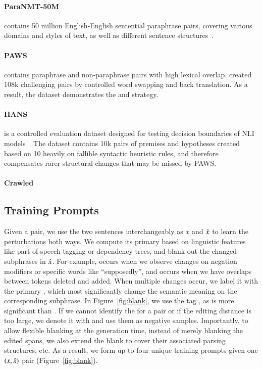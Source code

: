 \paragraph{ParaNMT-50M} contains 50 million English-English sentential paraphrase pairs, covering various domains and styles of text, as well as different sentence structures~\citet{wieting2017paranmt}. 

\paragraph{PAWS} contains paraphrase and non-paraphrase pairs with high lexical overlap. 
\citet{zhang2019paws} created 108k challenging pairs by controlled word swapping and back translation.
As a result, the dataset demonstrates the  and  strategy.


\paragraph{HANS} is a controlled evaluation dataset designed for testing decision boundaries of NLI models~\cite{mccoy2019right}. 
The dataset contains 10k pairs of premises and hypotheses created based on 10 heavily on fallible syntactic heuristic rules, and therefore compensates rarer structural changes that may be missed by PAWS.


\paragraph{Crawled} 



\subsection{Training Prompts}

Given a pair, we use the two sentences interchangeably as $x$ and $\hat{x}$ to learn the perturbations both ways.
We compute its primary \tagstr based on linguistic features like part-of-speech tagging or dependency trees, and blank out the changed subphrases in $\hat{x}$.
For example,  occurs when we observe changes on negation modifiers or specific words like ``supposedly'', and  occurs when we have overlaps between tokens deleted and added.
When multiple changes occur, we label it with the primary \tagstr, which most significantly change the semantic meaning on the corresponding subphrase.
In Figure~\ref{fig:blank}, we use the tag , as  is more significant than .
If we cannot identify the \tagstr for a pair or if the editing distance is too large, we denote it with \ctrltag{[global]} and use them as negative samples.
Importantly, to allow flexible blanking at the generation time, instead of merely blanking the edited spans, we also extend the blank to cover their associated parsing structures, etc.
As a result, we form up to four unique training prompts given one $(x, \hat{x})$ pair (Figure~\ref{fig:blank}).

